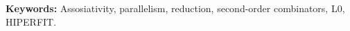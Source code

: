 \noindent\textbf{Keywords:} Assosiativity, parallelism, reduction, second-order
combinators, L0, HIPERFIT.
